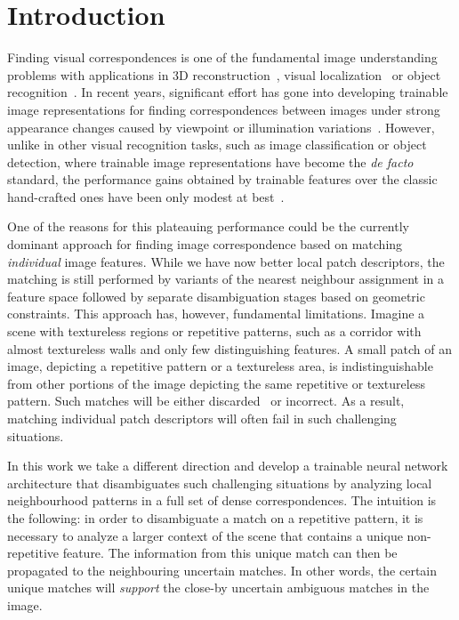 \documentclass{article}
\begin{document}
\section{Introduction \label{sec:intro}}

Finding visual correspondences is one of the fundamental image understanding problems with applications in 3D reconstruction~\cite{agarwal2011building}, visual localization~\cite{Sattler18,Taira18} or object recognition~\cite{liu2008siftflow}. In recent years, significant effort has gone into developing trainable image representations for finding correspondences between images under strong appearance changes caused by viewpoint or illumination variations~\cite{jahrer2008learned, fischer2014descriptor, zagoruyko2015learning, han2015matchnet, balntas2016pn, ConvOpt,DeepDesc,TFeat,yi2016lift}. However, unlike in other visual recognition tasks, such as image classification or object detection, where trainable image representations have become the \emph{de facto} standard, the performance gains obtained by trainable features over the classic hand-crafted ones have been only modest at best~\cite{Schonberger_2017_CVPR}.

One of the reasons for this plateauing performance could be the currently dominant approach for finding image correspondence based on matching  {\em individual} image features.
While we have now better local patch descriptors, the matching is still performed by variants of the nearest neighbour assignment in a feature space followed by separate disambiguation stages based on geometric constraints. This approach has, however, fundamental limitations. Imagine a scene with textureless regions or repetitive patterns, such as a corridor with almost textureless walls and only few distinguishing features.
A small patch of an image, depicting a repetitive pattern or a textureless area, is indistinguishable from other portions of the image depicting the same repetitive or textureless pattern. Such matches will be either discarded~\cite{lowe2004distinctive} or incorrect. As a result, matching individual patch descriptors will often fail in such challenging situations.


In this work we take a different direction and develop a trainable neural network architecture that disambiguates such challenging situations by analyzing local neighbourhood patterns in a full set of dense correspondences. The intuition is the following: in order to disambiguate a match on a repetitive pattern, it is necessary to analyze a larger context of the scene that contains a unique non-repetitive feature. The information from this unique match can then be propagated to the neighbouring uncertain matches.
In other words, the certain unique matches will \emph{support} the close-by uncertain ambiguous matches in the image.
\end{document}
